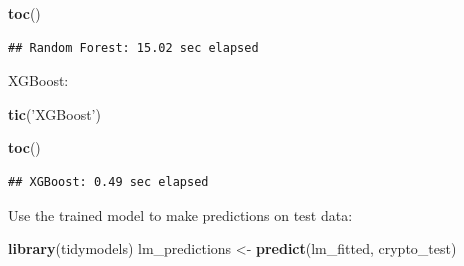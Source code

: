 \documentclass[
]{book}
\newenvironment{Shaded}{\begin{snugshade}}{\end{snugshade}}
\newcommand{\DataTypeTok}[1]{\textcolor[rgb]{0.13,0.29,0.53}{#1}}
\newcommand{\KeywordTok}[1]{\textcolor[rgb]{0.13,0.29,0.53}{\textbf{#1}}}
\newcommand{\NormalTok}[1]{#1}
\newcommand{\OperatorTok}[1]{\textcolor[rgb]{0.81,0.36,0.00}{\textbf{#1}}}
\newcommand{\StringTok}[1]{\textcolor[rgb]{0.31,0.60,0.02}{#1}}
\begin{document}
\begin{Shaded}
\begin{Highlighting}[]
\KeywordTok{toc}\NormalTok{()}
\end{Highlighting}
\end{Shaded}

\begin{verbatim}
## Random Forest: 15.02 sec elapsed
\end{verbatim}

XGBoost:

\begin{Shaded}
\begin{Highlighting}[]
\KeywordTok{tic}\NormalTok{(}\StringTok{'XGBoost'}\NormalTok{)}
\end{Highlighting}
\end{Shaded}

\begin{Shaded}
\end{Shaded}

\begin{Shaded}
\begin{Highlighting}[]
\KeywordTok{toc}\NormalTok{()}
\end{Highlighting}
\end{Shaded}

\begin{verbatim}
## XGBoost: 0.49 sec elapsed
\end{verbatim}

Use the trained model to make predictions on test data:

\begin{Shaded}
\begin{Highlighting}[]
\KeywordTok{library}\NormalTok{(tidymodels)}
\NormalTok{lm_predictions <-}\StringTok{ }\KeywordTok{predict}\NormalTok{(lm_fitted, crypto_test)}
\end{Highlighting}
\end{Shaded}

\begin{Shaded}
\end{Shaded}
\end{document}

